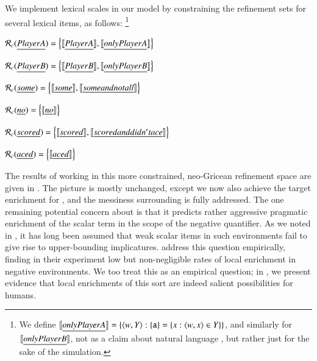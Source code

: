 \documentclass[leqno,12pt]{article}
\begin{document}
We implement lexical scales in our model by constraining the
refinement sets for several lexical items, as follows:%
\footnote{We define
  $\llbracket\emph{only Player A}\rrbracket = \left\{ \langle w, Y \rangle : \left\{ \texttt{a} \right\} =
    \left\{ x : \langle w,x \rangle \in Y \right\} \right\}$,
  and similarly for $\llbracket\emph{only Player B}\rrbracket$, not as a claim about
  natural language , but rather just for the sake of the
  simulation.}
%
\begin{examples}
\item\label{neo}
  \begin{examples}
  \item $\mathcal{R}_{c}(\emph{Player A}) = \left\{ \llbracket\emph{Player A}\rrbracket, \llbracket\emph{only Player A}\rrbracket \right\}$
  \item $\mathcal{R}_{c}(\emph{Player B}) = \left\{ \llbracket\emph{Player B}\rrbracket, \llbracket\emph{only Player B}\rrbracket \right\}$
  \item $\mathcal{R}_{c}(\emph{some}) = \left\{ \llbracket\emph{some}\rrbracket, \llbracket\emph{some and not all}\rrbracket \right\}$
  \item $\mathcal{R}_{c}(\emph{no}) = \left\{ \llbracket\emph{no}\rrbracket \right\}$    
  \item $\mathcal{R}_{c}(\emph{scored}) = \left\{ \llbracket\emph{scored}\rrbracket, \llbracket\emph{scored and didn't ace}\rrbracket \right\}$
  \item $\mathcal{R}_{c}(\emph{aced}) = \left\{ \llbracket\emph{aced}\rrbracket \right\}$
  \end{examples}
\end{examples}
%
The results of working in this more constrained, neo-Gricean
refinement space are given in . The
picture is mostly unchanged, except we now also achieve the target
enrichment for , and the messiness
surrounding  is fully addressed. The one
remaining potential concern about  is
that it predicts rather aggressive pragmatic enrichment of the scalar
term in the scope of the negative quantifier. As we noted in
, it has long been assumed that weak scalar
items in such environments fail to give rise to upper-bounding
implicatures. \citet{Chemla:Spector:2011} address this question
empirically, finding in their experiment low but non-negligible rates
of local enrichment in negative environments. We too treat this as an
empirical question; in , we present evidence that
local enrichments of this sort are indeed salient possibilities for
humans.
\end{document}
